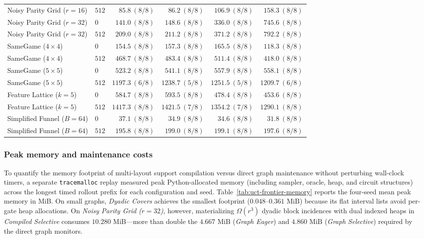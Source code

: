 \documentclass{article}
\theoremstyle{plain}
\theoremstyle{definition}
\begin{document}
\begin{table}[!t]
{\begin{tabular}{@{}llrrrr@{}}
Noisy Parity Grid ($r=16$) & $512$ & $85.8\ (8/8)$ & $86.2\ (8/8)$ & $106.9\ (8/8)$ & $158.3\ (8/8)$ \\
Noisy Parity Grid ($r=32$) & $0$ & $141.0\ (8/8)$ & $148.6\ (8/8)$ & $336.0\ (8/8)$ & $745.6\ (8/8)$ \\
Noisy Parity Grid ($r=32$) & $512$ & $209.0\ (8/8)$ & $211.2\ (8/8)$ & $371.2\ (8/8)$ & $792.2\ (8/8)$ \\
\midrule
SameGame ($4\times 4$) & $0$ & $154.5\ (8/8)$ & $157.3\ (8/8)$ & $165.5\ (8/8)$ & $118.3\ (8/8)$ \\
SameGame ($4\times 4$) & $512$ & $468.7\ (8/8)$ & $483.4\ (8/8)$ & $511.4\ (8/8)$ & $418.0\ (8/8)$ \\
SameGame ($5\times 5$) & $0$ & $523.2\ (8/8)$ & $541.1\ (8/8)$ & $557.9\ (8/8)$ & $558.1\ (8/8)$ \\
SameGame ($5\times 5$) & $512$ & $1197.3\ (6/8)$ & $1238.7\ (5/8)$ & $1251.5\ (5/8)$ & $1209.7\ (6/8)$ \\
\midrule
Feature Lattice ($k=5$) & $0$ & $584.7\ (8/8)$ & $593.5\ (8/8)$ & $478.4\ (8/8)$ & $453.6\ (8/8)$ \\
Feature Lattice ($k=5$) & $512$ & $1417.3\ (8/8)$ & $1421.5\ (7/8)$ & $1354.2\ (7/8)$ & $1290.1\ (8/8)$ \\
Simplified Funnel ($B=64$) & $0$ & $37.1\ (8/8)$ & $34.9\ (8/8)$ & $34.6\ (8/8)$ & $31.8\ (8/8)$ \\
Simplified Funnel ($B=64$) & $512$ & $195.8\ (8/8)$ & $199.0\ (8/8)$ & $199.1\ (8/8)$ & $197.6\ (8/8)$ \\
\bottomrule
\end{tabular}%
}
\end{table}

\subsubsection{Peak memory and maintenance costs}

To quantify the memory footprint of multi-layout support compilation versus direct graph maintenance without perturbing wall-clock timers, a separate \texttt{tracemalloc} replay measured peak Python-allocated memory (including sampler, oracle, heap, and circuit structures) across the longest timed rollout prefix for each configuration and seed. Table~\ref{tab:uct-frontier-memory} reports the four-seed mean peak memory in MiB. On small graphs, \emph{Dyadic Covers} achieves the smallest footprint ($0.048$--$0.361\text{ MiB}$) because its flat interval lists avoid per-gate heap allocations. On \emph{Noisy Parity Grid ($r=32$)}, however, materializing $\Omega(r^3)$ dyadic block incidences with dual indexed heaps in \emph{Compiled Selective} consumes $10.280\text{ MiB}$—more than double the $4.667\text{ MiB}$ (\emph{Graph Eager}) and $4.860\text{ MiB}$ (\emph{Graph Selective}) required by the direct graph monitors.
\end{document}

